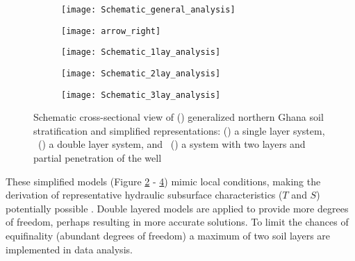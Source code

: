 \begin{figure}[h!]
	\centering
	\begin{subfigure}[b]{0.21\linewidth}
		\centering\texttt{[image: Schematic\_general\_analysis]}
		\captionsetup{justification=centering}		
		\caption{\label{fig:Schematic_general_analysis}}
		\end{subfigure}%
	\begin{subfigure}[b]{0.12\linewidth}
		\centering\texttt{[image: arrow\_right]}
		\end{subfigure}%
	\begin{subfigure}[b]{0.21\linewidth}
		\centering\texttt{[image: Schematic\_1lay\_analysis]}
		\captionsetup{justification=centering}		
		\caption{\label{fig:Schematic_1lay_analysis}}
		\end{subfigure}%
	\begin{subfigure}[b]{0.21\linewidth}
        \centering\texttt{[image: Schematic\_2lay\_analysis]}
		\captionsetup{justification=centering}		
		\caption{\label{fig:Schematic_2lay_analysis}}
		\end{subfigure}
	\begin{subfigure}[b]{0.21\linewidth}
        \centering\texttt{[image: Schematic\_3lay\_analysis]}
		\captionsetup{justification=centering}		
		\caption{\label{fig:Schematic_3lay_analysis}}
		\end{subfigure}
	\captionsetup{justification=centering}	
	\caption{Schematic cross-sectional view of () generalized northern Ghana soil stratification and simplified representations: () a single layer system, ~() a double layer system, and ~() a system with two layers and partial penetration of the well} 
	\label{fig:schematic_fieldwork_analysis}
\end{figure} 

These simplified models (Figure \ref{fig:Schematic_1lay_analysis} - \ref{fig:Schematic_3lay_analysis}) mimic local conditions, making the derivation of representative hydraulic subsurface characteristics ($T$ and $S$) potentially possible \citep{Kruseman2000}. Double layered models are applied to provide more degrees of freedom, perhaps resulting in more accurate solutions. To limit the chances of equifinality (abundant degrees of freedom) a maximum of two soil layers are implemented in data analysis. \\ 

